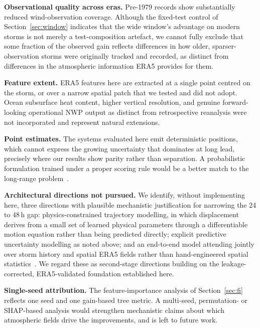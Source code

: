 \documentclass[10pt,twocolumn,a4paper]{article}
\newcommand{\era}{ERA5}
\begin{document}
\textbf{Observational quality across eras.} Pre-1979 records show substantially
reduced wind-observation coverage. Although the fixed-test control of
Section~\ref{sec:window} indicates that the wide window's advantage on modern
storms is not merely a test-composition artefact, we cannot fully exclude that
some fraction of the observed gain reflects differences in how older,
sparser-observation storms were originally tracked and recorded, as distinct from
differences in the atmospheric information \era{} provides for them.

\textbf{Feature extent.} \era{} features here are extracted at a single point
centred on the storm, or over a narrow spatial patch that we tested and did not
adopt. Ocean subsurface heat content, higher vertical resolution, and genuine
forward-looking operational NWP output as distinct from retrospective reanalysis
were not incorporated and represent natural extensions.

\textbf{Point estimates.} The systems evaluated here emit deterministic
positions, which cannot express the growing uncertainty that dominates at long
lead, precisely where our results show parity rather than separation. A
probabilistic formulation trained under a proper scoring rule would be a better
match to the long-range
problem~\cite{gneiting2007,giffard2020tropical}.

\textbf{Architectural directions not pursued.} We identify, without implementing
here, three directions with plausible mechanistic justification for narrowing the
24 to 48\,h gap: physics-constrained trajectory modelling, in which displacement
derives from a small set of learned physical parameters through a differentiable
motion equation rather than being predicted directly; explicit predictive
uncertainty modelling as noted above; and an end-to-end model attending jointly
over storm history and spatial \era{} fields rather than hand-engineered spatial
statistics~\cite{qu2025accurate,vaswani2017attention,giffard2020tropical}. We
regard these as second-stage directions building on the leakage-corrected,
\era{}-validated foundation established here.

\textbf{Single-seed attribution.} The feature-importance analysis of
Section~\ref{sec:fi} reflects one seed and one gain-based tree metric. A
multi-seed, permutation- or SHAP-based analysis would strengthen mechanistic
claims about which atmospheric fields drive the improvements, and is left to
future work.

\end{document}
